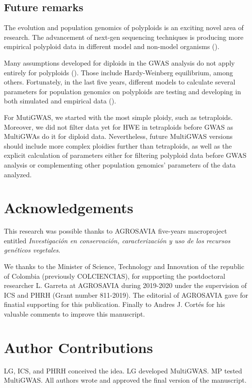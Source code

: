 \documentclass{article}
\begin{document}
\subsection{Future remarks}

The evolution and population genomics of polyploids is an exciting novel area of research. The advancement of next-gen sequencing techniques is producing more empirical polyploid data in different model and non-model organisms  (\cite{ekblom2011applications,ellegren2014genome}). 

Many assumptions developed for diploids in the GWAS analysis do not apply entirely for polyploids (\cite{dufresne2014}). Those include Hardy-Weinberg equilibrium, among others. Fortunately, in the last five years, different models to calculate several parameters for population genomics on polyploids are testing and developing in both simulated and empirical data (\cite{meirmans2018,hardy2016population,blischak2016accounting}). 

For MutiGWAS, we started with the most simple ploidy, such as tetraploids. Moreover, we did not filter data yet for HWE in tetraploids before GWAS as MultiGWAs do it for diploid data. Nevertheless, future MultiGWAS versions should include more complex ploidies further than tetraploids, as well as the explicit calculation of parameters either for filtering polyploid data before GWAS analysis or complementing other population genomics' parameters of the data analyzed.

\section{Acknowledgements}
This research was possible thanks to AGROSAVIA five-years macroproject entitled \emph{Investigación en conservación, caracterización y uso de los recursos genéticos vegetales}.
 
We thanks to the Minister of Science, Technology and Innovation of the republic of Colombia (previously COLCIENCIAS), for supporting the postdoctoral researcher L. Garreta at AGROSAVIA during 2019-2020 under the supervision of ICS and PHRH (Grant number 811-2019). The editorial of AGROSAVIA gave for finatial supporting for this publication. Finally to Andres J. Cortés for his valuable comments to improve this manuscript.


\section{Author Contributions}
LG, ICS, and PHRH conceived the idea. LG developed MultiGWAS. MP tested MultiGWAS. All authors wrote and approved the final version of the manuscript.


\printbibliography
\end{document}
